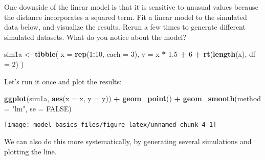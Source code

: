 \documentclass[]{book}
\newenvironment{Shaded}{\begin{snugshade}}{\end{snugshade}}
\newcommand{\DataTypeTok}[1]{\textcolor[rgb]{0.13,0.29,0.53}{#1}}
\newcommand{\DecValTok}[1]{\textcolor[rgb]{0.00,0.00,0.81}{#1}}
\newcommand{\FloatTok}[1]{\textcolor[rgb]{0.00,0.00,0.81}{#1}}
\newcommand{\KeywordTok}[1]{\textcolor[rgb]{0.13,0.29,0.53}{\textbf{#1}}}
\newcommand{\NormalTok}[1]{#1}
\newcommand{\OperatorTok}[1]{\textcolor[rgb]{0.81,0.36,0.00}{\textbf{#1}}}
\newcommand{\OtherTok}[1]{\textcolor[rgb]{0.56,0.35,0.01}{#1}}
\newcommand{\StringTok}[1]{\textcolor[rgb]{0.31,0.60,0.02}{#1}}
\theoremstyle{plain}
\theoremstyle{remark}
\begin{document}
One downside of the linear model is that it is sensitive to unusual
values because the distance incorporates a squared term. Fit a linear
model to the simulated data below, and visualize the results. Rerun a
few times to generate different simulated datasets. What do you notice
about the model?

\begin{Shaded}
\begin{Highlighting}[]
\NormalTok{sim1a <-}\StringTok{ }\KeywordTok{tibble}\NormalTok{(}
  \DataTypeTok{x =} \KeywordTok{rep}\NormalTok{(}\DecValTok{1}\OperatorTok{:}\DecValTok{10}\NormalTok{, }\DataTypeTok{each =} \DecValTok{3}\NormalTok{),}
  \DataTypeTok{y =}\NormalTok{ x }\OperatorTok{*}\StringTok{ }\FloatTok{1.5} \OperatorTok{+}\StringTok{ }\DecValTok{6} \OperatorTok{+}\StringTok{ }\KeywordTok{rt}\NormalTok{(}\KeywordTok{length}\NormalTok{(x), }\DataTypeTok{df =} \DecValTok{2}\NormalTok{)}
\NormalTok{)}
\end{Highlighting}
\end{Shaded}

Let's run it once and plot the results:

\begin{Shaded}
\begin{Highlighting}[]
\KeywordTok{ggplot}\NormalTok{(sim1a, }\KeywordTok{aes}\NormalTok{(}\DataTypeTok{x =}\NormalTok{ x, }\DataTypeTok{y =}\NormalTok{ y)) }\OperatorTok{+}
\StringTok{  }\KeywordTok{geom_point}\NormalTok{() }\OperatorTok{+}
\StringTok{  }\KeywordTok{geom_smooth}\NormalTok{(}\DataTypeTok{method =} \StringTok{"lm"}\NormalTok{, }\DataTypeTok{se =} \OtherTok{FALSE}\NormalTok{)}
\end{Highlighting}
\end{Shaded}

\begin{center}\texttt{[image: model-basics\_files/figure-latex/unnamed-chunk-4-1]} \end{center}

We can also do this more systematically, by generating several
simulations and plotting the line.
\end{document}
